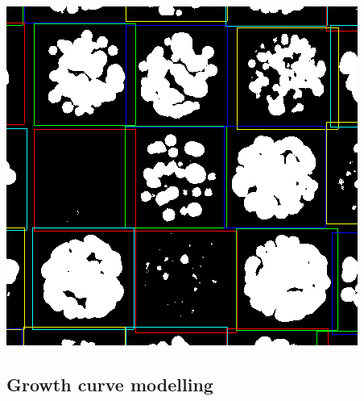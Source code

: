 \documentclass[mathserif,handout]{beamer}
\begin{document}
{\includegraphics[height=0.4\textheight]{figs/rod-plate-grid-thresh-zoom}

}


\subsection{Growth curve modelling}

\end{document}
